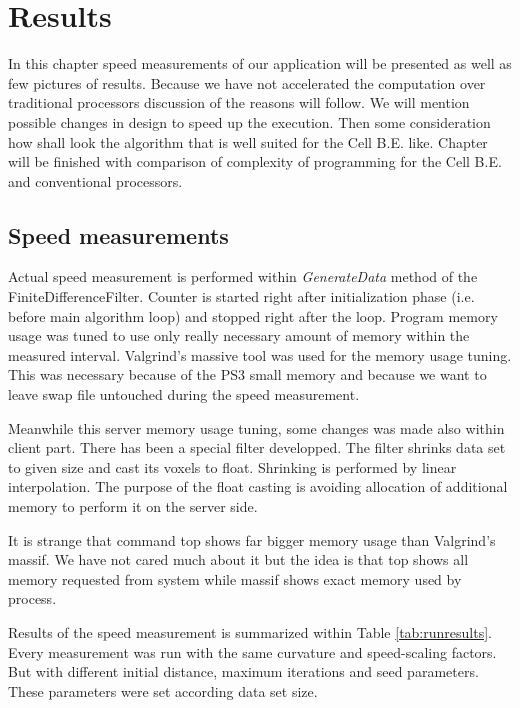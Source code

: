 \chapter{Results}

In this chapter speed measurements of our application will be presented as well as few pictures of results.
Because we have not accelerated the computation over traditional processors discussion of the reasons will follow.
We will mention possible changes in design to speed up the execution.
Then some consideration how shall look the algorithm that is well suited for the Cell B.E. like.
Chapter will be finished with comparison of complexity of programming for the Cell B.E. and conventional processors.

\section{Speed measurements}

\par
Actual speed measurement is performed within \emph{GenerateData} method of the FiniteDifferenceFilter.
Counter is started right after initialization phase (i.e. before main algorithm loop) and stopped right after the loop.
Program memory usage was tuned to use only really necessary amount of memory within the measured interval.
Valgrind's massive tool was used for the memory usage tuning.
This was necessary because of the PS3 small memory and because we want to leave swap file untouched during the speed measurement.

\par
Meanwhile this server memory usage tuning, some changes was made also within client part.
There has been a special filter developped.
The filter shrinks data set to given size and cast its voxels to float.
Shrinking is performed by linear interpolation.
The purpose of the float casting is avoiding allocation of additional memory to perform it on the server side.

\par
It is strange that command top shows far bigger memory usage than Valgrind's massif.
We have not cared much about it but the idea is that top shows all memory requested from system while massif shows exact memory used by process.

\par
Results of the speed measurement is summarized within Table \ref{tab:runresults}.
Every measurement was run with the same curvature and speed-scaling factors.
But with different initial distance, maximum iterations and seed parameters.
These parameters were set according data set size.

